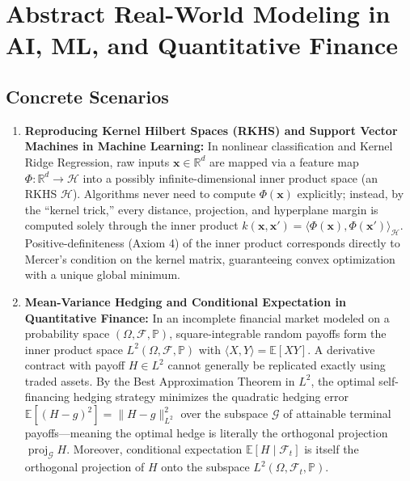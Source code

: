 \documentclass[11pt, letterpaper]{article}
\theoremstyle{definition}
\theoremstyle{remark}
\begin{document}
\newpage
\section{Abstract Real-World Modeling in AI, ML, and Quantitative Finance}

\subsection{Concrete Scenarios}

\begin{enumerate}
    \item \textbf{Reproducing Kernel Hilbert Spaces (RKHS) and Support Vector Machines in Machine Learning:}
    In nonlinear classification and Kernel Ridge Regression, raw inputs $\mathbf{x} \in \mathbb{R}^d$ are mapped via a feature map $\Phi: \mathbb{R}^d \to \mathcal{H}$ into a possibly infinite-dimensional inner product space (an RKHS $\mathcal{H}$). Algorithms never need to compute $\Phi(\mathbf{x})$ explicitly; instead, by the ``kernel trick,'' every distance, projection, and hyperplane margin is computed solely through the inner product $k(\mathbf{x}, \mathbf{x}') = \langle \Phi(\mathbf{x}), \Phi(\mathbf{x}') \rangle_{\mathcal{H}}$. Positive-definiteness (Axiom 4) of the inner product corresponds directly to Mercer's condition on the kernel matrix, guaranteeing convex optimization with a unique global minimum.

    \item \textbf{Mean-Variance Hedging and Conditional Expectation in Quantitative Finance:}
    In an incomplete financial market modeled on a probability space $(\Omega, \mathcal{F}, \mathbb{P})$, square-integrable random payoffs form the inner product space $L^2(\Omega, \mathcal{F}, \mathbb{P})$ with $\langle X, Y \rangle = \mathbb{E}[XY]$. A derivative contract with payoff $H \in L^2$ cannot generally be replicated exactly using traded assets. By the Best Approximation Theorem in $L^2$, the optimal self-financing hedging strategy minimizes the quadratic hedging error $\mathbb{E}[(H - g)^2] = \|H - g\|_{L^2}^2$ over the subspace $\mathcal{G}$ of attainable terminal payoffs—meaning the optimal hedge is literally the orthogonal projection $\operatorname{proj}_{\mathcal{G}} H$. Moreover, conditional expectation $\mathbb{E}[H \mid \mathcal{F}_t]$ is itself the orthogonal projection of $H$ onto the subspace $L^2(\Omega, \mathcal{F}_t, \mathbb{P})$.


\end{enumerate}
\end{document}
